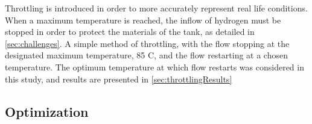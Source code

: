 Throttling is introduced in order to more accurately represent real life conditions. When a maximum temperature is reached, the inflow of hydrogen must be stopped in order to protect the materials of the tank, as detailed in \cref{sec:challenges}. A simple method of throttling, with the flow stopping at the designated maximum temperature, 85 \degree C, and the flow restarting at a chosen temperature. The optimum temperature at which flow restarts was considered in this study, and results are presented in \cref{sec:throttlingResults}


\subsection{Optimization}

